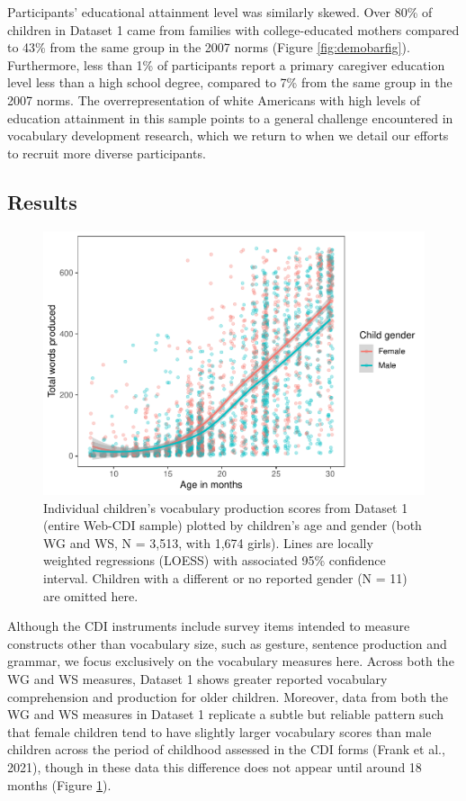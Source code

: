 \documentclass[
  english,
  ,man,floatsintext]{apa6}
\begin{document}
Participants' educational attainment level was similarly skewed. Over 80\% of children in Dataset 1 came from families with college-educated mothers compared to 43\% from the same group in the 2007 norms (Figure \ref{fig:demobarfig}). Furthermore, less than 1\% of participants report a primary caregiver education level less than a high school degree, compared to 7\% from the same group in the 2007 norms. The overrepresentation of white Americans with high levels of education attainment in this sample points to a general challenge encountered in vocabulary development research, which we return to when we detail our efforts to recruit more diverse participants.

\hypertarget{results}{%
\subsection{Results}\label{results}}

\begin{figure}
\centering
\includegraphics{webcdi_paper_files/figure-latex/genderfig-1.pdf}
\caption{\label{fig:genderfig}Individual children's vocabulary production scores from Dataset 1 (entire Web-CDI sample) plotted by children's age and gender (both WG and WS, N = 3,513, with 1,674 girls). Lines are locally weighted regressions (LOESS) with associated 95\% confidence interval. Children with a different or no reported gender (N = 11) are omitted here.}
\end{figure}

Although the CDI instruments include survey items intended to measure constructs other than vocabulary size, such as gesture, sentence production and grammar, we focus exclusively on the vocabulary measures here. Across both the WG and WS measures, Dataset 1 shows greater reported vocabulary comprehension and production for older children. Moreover, data from both the WG and WS measures in Dataset 1 replicate a subtle but reliable pattern such that female children tend to have slightly larger vocabulary scores than male children across the period of childhood assessed in the CDI forms (Frank et al., 2021), though in these data this difference does not appear until around 18 months (Figure \ref{fig:genderfig}).
\end{document}
